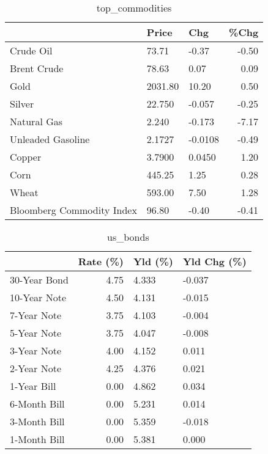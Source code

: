 \documentclass{article}%
\begin{document}
\begin{table}[htbp]%
\caption{top\_commodities}%
\centering%
\begin{adjustbox}{width=1\textwidth}%
\begin{tabular}{lllr}
\toprule
                          &   Price &     Chg &  \%Chg \\
\midrule
               Crude Oil  &   73.71 &   -0.37 & -0.50 \\
             Brent Crude  &   78.63 &    0.07 &  0.09 \\
                    Gold  & 2031.80 &   10.20 &  0.50 \\
                  Silver  &  22.750 &  -0.057 & -0.25 \\
             Natural Gas  &   2.240 &  -0.173 & -7.17 \\
       Unleaded Gasoline  &  2.1727 & -0.0108 & -0.49 \\
                  Copper  &  3.7900 &  0.0450 &  1.20 \\
                    Corn  &  445.25 &    1.25 &  0.28 \\
                   Wheat  &  593.00 &    7.50 &  1.28 \\
Bloomberg Commodity Index &   96.80 &   -0.40 & -0.41 \\
\bottomrule
\end{tabular}
%
\end{adjustbox}%
\end{table}

%


\begin{table}[htbp]%
\caption{us\_bonds}%
\centering%
\begin{adjustbox}{width=1\textwidth}%
\begin{tabular}{lrll}
\toprule
             &  Rate (\%) & Yld (\%) & Yld Chg (\%) \\
\midrule
30-Year Bond &      4.75 &   4.333 &      -0.037 \\
10-Year Note &      4.50 &   4.131 &      -0.015 \\
 7-Year Note &      3.75 &   4.103 &      -0.004 \\
 5-Year Note &      3.75 &   4.047 &      -0.008 \\
 3-Year Note &      4.00 &   4.152 &       0.011 \\
 2-Year Note &      4.25 &   4.376 &       0.021 \\
 1-Year Bill &      0.00 &   4.862 &       0.034 \\
6-Month Bill &      0.00 &   5.231 &       0.014 \\
3-Month Bill &      0.00 &   5.359 &      -0.018 \\
1-Month Bill &      0.00 &   5.381 &       0.000 \\
\bottomrule
\end{tabular}
%
\end{adjustbox}%
\end{table}
\end{document}
